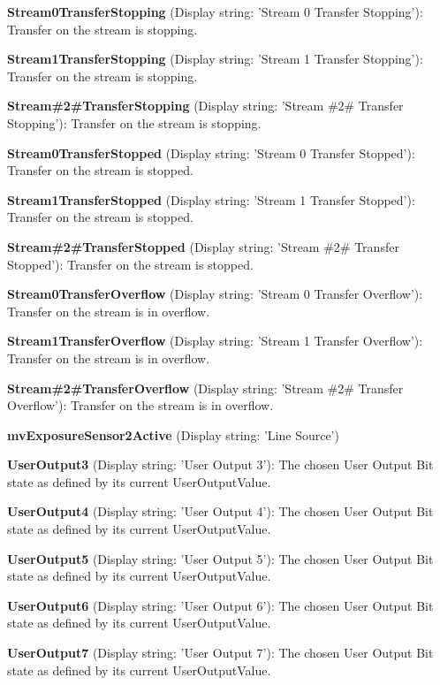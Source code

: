 \begin{DoxyItemize}
\item {\bfseries Stream0\+Transfer\+Stopping} (Display string\+: 'Stream 0 Transfer Stopping')\+: Transfer on the stream is stopping.
\item {\bfseries Stream1\+Transfer\+Stopping} (Display string\+: 'Stream 1 Transfer Stopping')\+: Transfer on the stream is stopping.
\item {\bfseries Stream\#2\#Transfer\+Stopping} (Display string\+: 'Stream \#2\# Transfer Stopping')\+: Transfer on the stream is stopping.
\item {\bfseries Stream0\+Transfer\+Stopped} (Display string\+: 'Stream 0 Transfer Stopped')\+: Transfer on the stream is stopped.
\item {\bfseries Stream1\+Transfer\+Stopped} (Display string\+: 'Stream 1 Transfer Stopped')\+: Transfer on the stream is stopped.
\item {\bfseries Stream\#2\#Transfer\+Stopped} (Display string\+: 'Stream \#2\# Transfer Stopped')\+: Transfer on the stream is stopped.
\item {\bfseries Stream0\+Transfer\+Overflow} (Display string\+: 'Stream 0 Transfer Overflow')\+: Transfer on the stream is in overflow.
\item {\bfseries Stream1\+Transfer\+Overflow} (Display string\+: 'Stream 1 Transfer Overflow')\+: Transfer on the stream is in overflow.
\item {\bfseries Stream\#2\#Transfer\+Overflow} (Display string\+: 'Stream \#2\# Transfer Overflow')\+: Transfer on the stream is in overflow.
\item {\bfseries mv\+Exposure\+Sensor2\+Active} (Display string\+: 'Line Source')
\item {\bfseries User\+Output3} (Display string\+: 'User Output 3')\+: The chosen User Output Bit state as defined by its current User\+Output\+Value.
\item {\bfseries User\+Output4} (Display string\+: 'User Output 4')\+: The chosen User Output Bit state as defined by its current User\+Output\+Value.
\item {\bfseries User\+Output5} (Display string\+: 'User Output 5')\+: The chosen User Output Bit state as defined by its current User\+Output\+Value.
\item {\bfseries User\+Output6} (Display string\+: 'User Output 6')\+: The chosen User Output Bit state as defined by its current User\+Output\+Value.
\item {\bfseries User\+Output7} (Display string\+: 'User Output 7')\+: The chosen User Output Bit state as defined by its current User\+Output\+Value.

\end{DoxyItemize}
